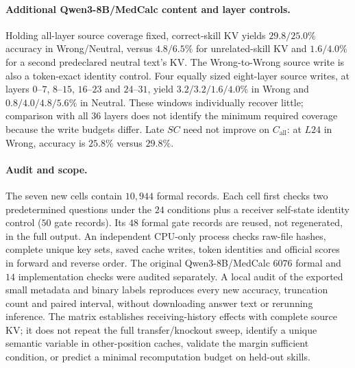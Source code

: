 \paragraph{Additional Qwen3-8B/MedCalc content and layer controls.}
Holding all-layer source coverage fixed, correct-skill KV yields
$29.8/25.0\%$ accuracy in Wrong/Neutral, versus $4.8/6.5\%$ for
unrelated-skill KV and $1.6/4.0\%$ for a second predeclared neutral
text's KV. The Wrong-to-Wrong source write is also a token-exact identity
control. Four equally sized eight-layer source writes, at layers
$0$--$7$, $8$--$15$, $16$--$23$ and $24$--$31$, yield
$3.2/3.2/1.6/4.0\%$ in Wrong and $0.8/4.0/4.8/5.6\%$ in Neutral.
These windows individually recover little; comparison with all $36$
layers does not identify the minimum required coverage because the write
budgets differ. Late $SC$ need not improve on $C_{\mathrm{all}}$:
at $L24$ in Wrong, accuracy is $25.8\%$ versus $29.8\%$.


\paragraph{Audit and scope.}
The seven new cells contain $10{,}944$ formal records. Each cell first
checks two predetermined questions under the $24$ conditions plus a
receiver self-state identity control ($50$ gate records). Its $48$ formal
gate records are reused, not regenerated, in the full output. An independent
CPU-only process checks raw-file hashes, complete unique key sets, saved
cache writes, token identities and official scores in forward and reverse
order. The original Qwen3-8B/MedCalc $6076$ formal and $14$ implementation
checks were audited separately. A local audit of the exported small
metadata and binary labels reproduces every new accuracy, truncation count
and paired interval, without downloading answer text or rerunning inference.
The matrix establishes receiving-history effects with complete source KV;
it does not repeat the full transfer/knockout sweep, identify a unique
semantic variable in other-position caches, validate the margin sufficient
condition, or predict a minimal recomputation budget on held-out skills.
